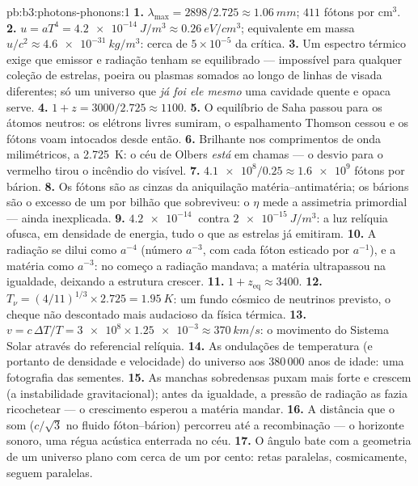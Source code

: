 \begin{solution}{pb:b3:photons-phonons:1}
\textbf{1.} $\lambda_{\max} = 2898/2.725 \approx \qty{1.06}{mm}$;
$411$ fótons por cm$^3$.
\textbf{2.} $u = aT^4 = \qty{4.2e-14}{J/m^3} \approx
\qty{0.26}{eV/cm^3}$; equivalente em massa $u/c^2 \approx
\qty{4.6e-31}{kg/m^3}$: cerca de $5\times10^{-5}$ da crítica.
\textbf{3.} Um espectro térmico exige que emissor e radiação tenham
se equilibrado --- impossível para qualquer coleção de estrelas,
poeira ou plasmas somados ao longo de linhas de visada diferentes; só
um universo que \emph{já foi ele mesmo} uma cavidade quente e opaca serve.
\textbf{4.} $1 + z = 3000/2.725 \approx 1100$.
\textbf{5.} O equilíbrio de Saha passou para os átomos neutros: os
elétrons livres sumiram, o espalhamento Thomson cessou e os fótons
voam intocados desde então.
\textbf{6.} Brilhante nos comprimentos de onda milimétricos, a
\qty{2.725}{K}: o céu de Olbers \emph{está} em chamas --- o desvio para
o vermelho tirou o incêndio do visível.
\textbf{7.} $\num{4.1e8}/0.25 \approx \num{1.6e9}$ fótons por
bárion.
\textbf{8.} Os fótons são as cinzas da aniquilação
matéria--antimatéria; os bárions são o excesso de um por bilhão que
sobreviveu: o $\eta$ mede a assimetria primordial --- ainda
inexplicada.
\textbf{9.} $\qty{4.2e-14}{}$ contra $\qty{2e-15}{J/m^3}$: a
luz relíquia ofusca, em densidade de energia, tudo o que as estrelas
já emitiram.
\textbf{10.} A radiação se dilui como $a^{-4}$ (número $a^{-3}$,
com cada fóton esticado por $a^{-1}$), e a matéria como $a^{-3}$: no
começo a radiação mandava; a matéria ultrapassou na igualdade,
deixando a estrutura crescer.
\textbf{11.} $1 + z_{\text{eq}} \approx 3400$.
\textbf{12.} $T_\nu = (4/11)^{1/3} \times 2.725 =
\qty{1.95}{K}$: um fundo cósmico de neutrinos previsto, o cheque não
descontado mais audacioso da física térmica.
\textbf{13.} $v = c\,\Delta T/T = \num{3e8} \times \num{1.25e-3}
\approx \qty{370}{km/s}$: o movimento do Sistema Solar através do
referencial relíquia.
\textbf{14.} As ondulações de temperatura (e portanto de densidade e
velocidade) do universo aos 380\,000 anos de idade: uma fotografia
das sementes.
\textbf{15.} As manchas sobredensas puxam mais forte e crescem (a
instabilidade gravitacional); antes da igualdade, a pressão de radiação
as fazia ricochetear --- o crescimento esperou a matéria mandar.
\textbf{16.} A distância que o som ($c/\sqrt3$ no
fluido fóton--bárion) percorreu até a recombinação --- o horizonte
sonoro, uma régua acústica enterrada no céu.
\textbf{17.} O ângulo bate com a geometria de um universo plano com
cerca de um por cento: retas paralelas, cosmicamente, seguem paralelas.

\end{solution}
